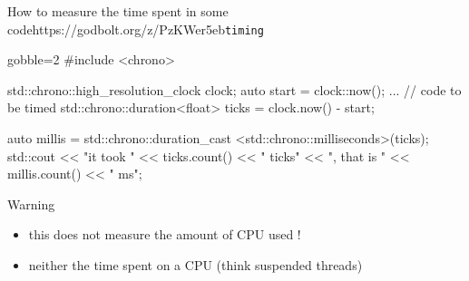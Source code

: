 \begin{frame}[fragile]
  \begin{exampleblockGB}{How to measure the time spent in some code}{https://godbolt.org/z/PzKWer5eb}{\texttt{timing}}
    \small
    \begin{cppcode*}{gobble=2}
      #include <chrono>

      std::chrono::high_resolution_clock clock;
      auto start = clock::now();
      ... // code to be timed
      std::chrono::duration<float> ticks = clock.now() - start;

      auto millis = std::chrono::duration_cast
                    <std::chrono::milliseconds>(ticks);
      std::cout << "it took " << ticks.count() << " ticks"
                << ", that is " << millis.count() << " ms\n";
    \end{cppcode*}
  \end{exampleblockGB}
  \pause
  \begin{alertblock}{Warning}
    \begin{itemize}
    \item this does not measure the amount of CPU used !
    \item neither the time spent on a CPU (think suspended threads)
    \end{itemize}
  \end{alertblock}
\end{frame}
